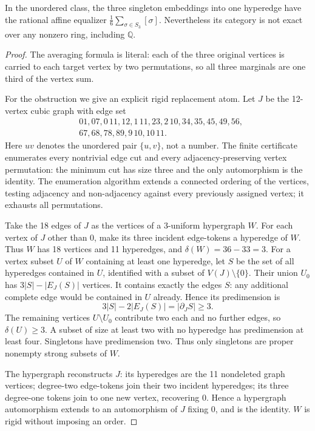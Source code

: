 \begin{theorem}
\label{D:unordered}
In the unordered class, the three singleton embeddings into one
hyperedge have the rational affine equalizer
$\frac16\sum_{\sigma\in S_3}[\sigma]$. Nevertheless its category
is not exact over any nonzero ring, including $\mathbb Q$.
\end{theorem}
\begin{proof}
The averaging formula is literal: each of the three original
vertices is carried to each target vertex by two permutations, so
all three marginals are one third of the vertex sum.

For the obstruction we give an explicit rigid replacement atom.
Let $J$ be the 12-vertex cubic graph with edge set
\[
\begin{split}
&01,07,0\,11,12,1\,11,23,2\,10,34,35,45,49,56,\\
&67,68,78,89,9\,10,10\,11.
\end{split}
\]
Here $uv$ denotes the unordered pair $\{u,v\}$, not a number.
The finite certificate enumerates every nontrivial edge cut and
every adjacency-preserving vertex permutation: the minimum cut
has size three and the only automorphism is the identity.
The enumeration algorithm extends a connected ordering of the
vertices, testing adjacency and non-adjacency against every
previously assigned vertex; it exhausts all permutations.

Take the 18 edges of $J$ as the vertices of a 3-uniform hypergraph
$W$. For each vertex of $J$ other than $0$, make its three incident
edge-tokens a hyperedge of $W$. Thus $W$ has 18 vertices and 11
hyperedges, and $\delta(W)=36-33=3$.
For a vertex subset $U$ of $W$ containing at least one hyperedge,
let $S$ be the set of all hyperedges contained in $U$, identified
with a subset of $V(J)\setminus\{0\}$. Their union $U_0$ has
$3|S|-|E_J(S)|$ vertices. It contains exactly the edges $S$: any
additional complete edge would be contained in $U$ already. Hence
its predimension is
\[
              3|S|-2|E_J(S)|=|\partial_J S|\geq3.
\]
The remaining vertices $U\setminus U_0$ contribute two each
and no further edges, so $\delta(U)\geq3$. A subset of size at least
two with no hyperedge has predimension at least four. Singletons
have predimension two. Thus only singletons are proper nonempty
strong subsets of $W$.

The hypergraph reconstructs $J$: its hyperedges are the 11
nondeleted graph vertices; degree-two edge-tokens join their two
incident hyperedges; its three degree-one tokens join to one new
vertex, recovering $0$. Hence a hypergraph automorphism extends
to an automorphism of $J$ fixing $0$, and is the identity. $W$
is rigid without imposing an order.


\end{proof}
